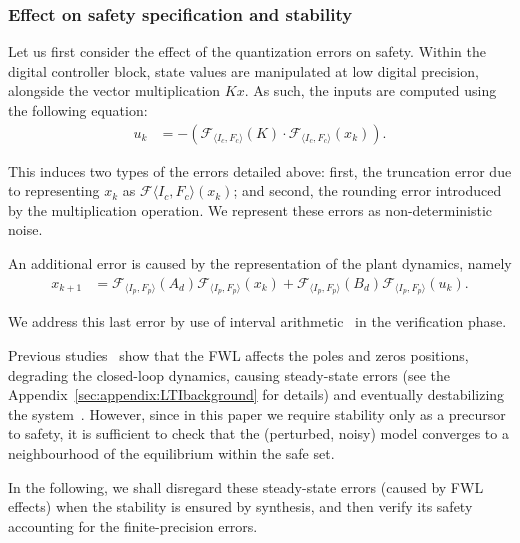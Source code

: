\documentclass[runningheads,a4paper]{llncs}
\begin{document}
\subsubsection{Effect on safety specification and stability}

Let us first consider the effect of the quantization errors on safety. 
Within the digital controller block, 
state values are manipulated at low digital precision, 
alongside the vector multiplication $Kx$.   
As such, the inputs are computed using the following equation: 
\begin{align*}
u_{k}&=-(\mathcal{F}_{\langle I_c,F_c \rangle}(K)\cdot\mathcal{F}_{\langle I_c,F_c \rangle}(x_{k})). 
\end{align*}

This induces two types of the errors detailed above:  
first, the truncation error due to representing $x_k$ as $\mathcal{F}{\langle I_c,F_c \rangle}(x_{k})$; 
and second, the rounding error introduced by the multiplication operation. 
We represent these errors as non-deterministic noise.

An additional error is caused by the representation of the plant dynamics, namely 
\begin{align*}
x_{k+1} &=\mathcal{F}_{\langle I_p,F_p \rangle}(A_d) \mathcal{F}_{\langle I_p,F_p \rangle}(x_{k}) + \mathcal{F}_{\langle I_p,F_p \rangle}(B_d)\mathcal{F}_{\langle I_p,F_p \rangle}(u_{k}).
\end{align*}

We address this last error by use of interval arithmetic~\cite{moore1966interval} in the verification phase.

Previous studies~\cite{gangli1} show that the FWL affects the poles and 
zeros positions, degrading the closed-loop dynamics, causing steady-state 
errors (see the Appendix~\ref{sec:appendix:LTIbackground} for details) 
and eventually destabilizing  the system~\cite{Bessa16}. However, since 
in this paper we require stability only as a precursor to safety, it is 
sufficient to check that the (perturbed, noisy) model converges to a neighbourhood of the equilibrium within the safe set.  

In the following, we shall disregard these steady-state errors (caused by FWL effects)
 when the stability is ensured by synthesis, and then verify its safety accounting for the finite-precision errors. 
\end{document}
